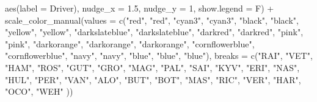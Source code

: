 \documentclass[
]{book}
\newenvironment{Shaded}{\begin{snugshade}}{\end{snugshade}}
\newcommand{\AttributeTok}[1]{\textcolor[rgb]{0.77,0.63,0.00}{#1}}
\newcommand{\DecValTok}[1]{\textcolor[rgb]{0.00,0.00,0.81}{#1}}
\newcommand{\FloatTok}[1]{\textcolor[rgb]{0.00,0.00,0.81}{#1}}
\newcommand{\FunctionTok}[1]{\textcolor[rgb]{0.00,0.00,0.00}{#1}}
\newcommand{\NormalTok}[1]{#1}
\newcommand{\SpecialCharTok}[1]{\textcolor[rgb]{0.00,0.00,0.00}{#1}}
\newcommand{\StringTok}[1]{\textcolor[rgb]{0.31,0.60,0.02}{#1}}
\begin{document}
\begin{Shaded}
\begin{Highlighting}[]
            \FunctionTok{aes}\NormalTok{(}\AttributeTok{label =}\NormalTok{ Driver),}
            \AttributeTok{nudge\_x =} \FloatTok{1.5}\NormalTok{, }\AttributeTok{nudge\_y =} \DecValTok{1}\NormalTok{, }\AttributeTok{show.legend =}\NormalTok{ F) }\SpecialCharTok{+} 
  \FunctionTok{scale\_color\_manual}\NormalTok{(}\AttributeTok{values =} \FunctionTok{c}\NormalTok{(}\StringTok{"red"}\NormalTok{, }\StringTok{"red"}\NormalTok{, }
                                \StringTok{"cyan3"}\NormalTok{, }\StringTok{"cyan3"}\NormalTok{, }
                                \StringTok{"black"}\NormalTok{, }\StringTok{"black"}\NormalTok{, }
                                \StringTok{"yellow"}\NormalTok{, }\StringTok{"yellow"}\NormalTok{, }
                                \StringTok{"darkslateblue"}\NormalTok{, }\StringTok{"darkslateblue"}\NormalTok{,}
                                \StringTok{"darkred"}\NormalTok{, }\StringTok{"darkred"}\NormalTok{, }
                                \StringTok{"pink"}\NormalTok{, }\StringTok{"pink"}\NormalTok{, }
                                \StringTok{"darkorange"}\NormalTok{, }\StringTok{"darkorange"}\NormalTok{, }\StringTok{"darkorange"}\NormalTok{,}
                                \StringTok{"cornflowerblue"}\NormalTok{, }\StringTok{"cornflowerblue"}\NormalTok{, }
                                \StringTok{"navy"}\NormalTok{, }\StringTok{"navy"}\NormalTok{,}
                                \StringTok{"blue"}\NormalTok{, }\StringTok{"blue"}\NormalTok{, }\StringTok{"blue"}\NormalTok{),}
                     \AttributeTok{breaks =} \FunctionTok{c}\NormalTok{(}\StringTok{"RAI"}\NormalTok{, }\StringTok{"VET"}\NormalTok{,}
                                \StringTok{"HAM"}\NormalTok{, }\StringTok{"ROS"}\NormalTok{,}
                                \StringTok{"GUT"}\NormalTok{, }\StringTok{"GRO"}\NormalTok{,}
                                \StringTok{"MAG"}\NormalTok{, }\StringTok{"PAL"}\NormalTok{, }
                                \StringTok{"SAI"}\NormalTok{, }\StringTok{"KYV"}\NormalTok{,}
                                \StringTok{"ERI"}\NormalTok{, }\StringTok{"NAS"}\NormalTok{, }
                                \StringTok{"HUL"}\NormalTok{, }\StringTok{"PER"}\NormalTok{,  }
                                \StringTok{"VAN"}\NormalTok{, }\StringTok{"ALO"}\NormalTok{, }\StringTok{"BUT"}\NormalTok{,}
                                \StringTok{"BOT"}\NormalTok{, }\StringTok{"MAS"}\NormalTok{,}
                                \StringTok{"RIC"}\NormalTok{, }\StringTok{"VER"}\NormalTok{,}
                                \StringTok{"HAR"}\NormalTok{, }\StringTok{"OCO"}\NormalTok{, }\StringTok{"WEH"}
\NormalTok{                                )) }
\end{Highlighting}
\end{Shaded}
\end{document}
